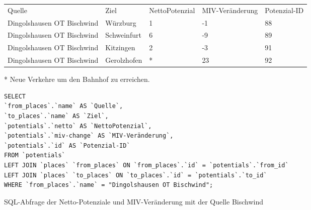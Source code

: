 \begin{tabular}{ l  l  l  l  l }
Quelle & Ziel & NettoPotenzial & MIV-Veränderung & Potenzial-ID\\ 
Dingolshausen OT Bischwind & Würzburg & 1 & -1 & 88\\ 
Dingolshausen OT Bischwind & Schweinfurt & 6 & -9 & 89\\ 
Dingolshausen OT Bischwind & Kitzingen & 2 & -3 & 91\\ 
Dingolshausen OT Bischwind & Gerolzhofen & * & 23 & 92\\ 
\end{tabular}
\newline
\newline
* Neue Verkehre um den Bahnhof zu erreichen.
\newline
\begin{listing}[htbp]
\begin{verbatim}
SELECT
`from_places`.`name` AS `Quelle`, 
`to_places`.`name` AS `Ziel`, 
`potentials`.`netto` AS `NettoPotenzial`, 
`potentials`.`miv-change` AS `MIV-Veränderung`, 
`potentials`.`id` AS `Potenzial-ID`
FROM `potentials`
LEFT JOIN `places` `from_places` ON `from_places`.`id` = `potentials`.`from_id`
LEFT JOIN `places` `to_places` ON `to_places`.`id` = `potentials`.`to_id`
WHERE `from_places`.`name` = "Dingolshausen OT Bischwind";
\end{verbatim}
\caption{SQL-Abfrage der Netto-Potenziale und MIV-Veränderung mit der Quelle Bischwind}\label{lst-fz-bischwind}
\end{listing}